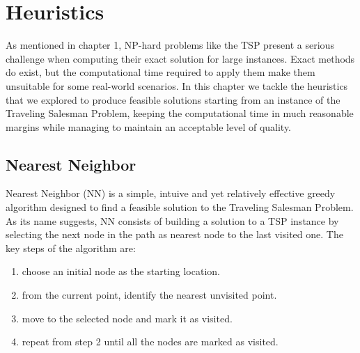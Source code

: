 \chapter{Heuristics}
As mentioned in chapter 1, NP-hard problems like the TSP present a serious challenge when computing their exact solution for large instances.
Exact methods do exist, but the computational time required to apply them make them unsuitable for some real-world scenarios.
In this chapter we tackle the heuristics that we explored to produce feasible solutions starting from an instance of the Traveling Salesman Problem,
keeping the computational time in much reasonable margins while managing to maintain an acceptable level of quality.


\section{Nearest Neighbor}

Nearest Neighbor (NN) is a simple, intuive and yet relatively effective greedy algorithm designed to find a feasible solution to the Traveling Salesman Problem.
As its name suggests, NN consists of building a solution to a TSP instance by selecting the next node in the path as nearest node to the last visited one.
The key steps of the algorithm are:
\begin{enumerate}
    \item choose an initial node as the starting location.
    \item from the current point, identify the nearest unvisited point.
    \item move to the selected node and mark it as visited.
    \item repeat from step 2 until all the nodes are marked as visited.
\end{enumerate}

